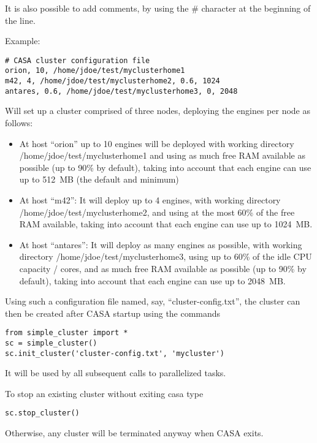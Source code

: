 It is also possible to add comments, by using the \# character at the beginning of the line. 

\vspace{2mm}

\noindent
Example:

\begin{center}
\begin{verbatim}
# CASA cluster configuration file
orion, 10, /home/jdoe/test/myclusterhome1
m42, 4, /home/jdoe/test/myclusterhome2, 0.6, 1024
antares, 0.6, /home/jdoe/test/myclusterhome3, 0, 2048
\end{verbatim}
\end{center}
Will set up a cluster comprised of three nodes, deploying the engines per node as follows:

\begin{itemize}
\item  At host ``orion'' up to 10 engines will be deployed with working directory /home/jdoe/test/myclusterhome1 
and using as much free RAM available as possible (up to 90\% by default), taking into account that each engine can use up to 512~MB (the default and minimum)

\item  At host ``m42'': It will deploy up to 4 engines, with working directory /home/jdoe/test/myclusterhome2, 
and using at the most 60\% of the free RAM available, taking into account that each engine can use up to 1024~MB.

\item At host ``antares'': It will deploy as many engines as possible, with working directory /home/jdoe/test/myclusterhome3, 
using up to 60\% of the idle CPU capacity / cores, and as much free RAM available as possible (up to 90\% by default), taking 
into account that each engine can use up to 2048~MB.
\end{itemize}

Using such a configuration file named, say, ``cluster-config.txt'', the cluster can then
be created after CASA startup using the commands
\begin{verbatim}
from simple_cluster import *
sc = simple_cluster()
sc.init_cluster('cluster-config.txt', 'mycluster')
\end{verbatim}
It will be used by all subsequent calls to parallelized tasks.

To stop an existing cluster without exiting casa type
\begin{verbatim}
sc.stop_cluster()
\end{verbatim}
Otherwise, any cluster will be terminated anyway when CASA exits.

